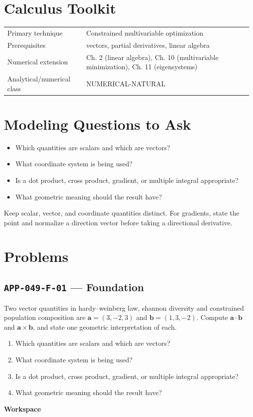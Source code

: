 \documentclass[11pt]{book}
\newcommand{\pid}[1]{\texttt{#1}}
\newcommand{\workspace}{\par\vspace{0.7in}\hrulefill\par\vspace{0.55in}\hrulefill\par}
\begin{document}
\section*{Calculus Toolkit}
\begin{tabularx}{\textwidth}{@{}lX@{}}\toprule
Primary technique & Constrained multivariable optimization \\
Prerequisites & vectors, partial derivatives, linear algebra \\
Numerical extension & Ch. 2 (linear algebra), Ch. 10 (multivariable minimization), Ch. 11 (eigensystems) \\
Analytical/numerical class & NUMERICAL-NATURAL \\
\bottomrule\end{tabularx}
\section*{Modeling Questions to Ask}\begin{itemize}
\item Which quantities are scalars and which are vectors?
\item What coordinate system is being used?
\item Is a dot product, cross product, gradient, or multiple integral appropriate?
\item What geometric meaning should the result have?
\end{itemize}
\begin{errorbox}Keep scalar, vector, and coordinate quantities distinct. For gradients, state the point and normalize a direction vector before taking a directional derivative.\end{errorbox}
\section*{Problems}
\subsection*{\pid{APP-049-F-01} — Foundation}
\begin{problembox}
Two vector quantities in hardy–weinberg law, shannon diversity and constrained population composition are $\mathbf a=(3,-2,3)$ and $\mathbf b=(1,3,-2)$. Compute $\mathbf a\cdot\mathbf b$ and $\mathbf a\times\mathbf b$, and state one geometric interpretation of each.
\end{problembox}
\begin{promptbox}\begin{enumerate}
\item Which quantities are scalars and which are vectors?
\item What coordinate system is being used?
\item Is a dot product, cross product, gradient, or multiple integral appropriate?
\item What geometric meaning should the result have?
\end{enumerate}\end{promptbox}
\textbf{Workspace}\workspace
{}
\end{document}
